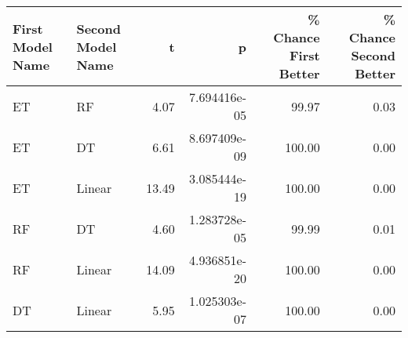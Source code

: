 \begin{tabular}{llrrrr}
\toprule
First Model Name & Second Model Name &     t &            p &  \% Chance First Better &  \% Chance Second Better \\
\midrule
              ET &                RF &  4.07 & 7.694416e-05 &                  99.97 &                    0.03 \\
              ET &                DT &  6.61 & 8.697409e-09 &                 100.00 &                    0.00 \\
              ET &            Linear & 13.49 & 3.085444e-19 &                 100.00 &                    0.00 \\
              RF &                DT &  4.60 & 1.283728e-05 &                  99.99 &                    0.01 \\
              RF &            Linear & 14.09 & 4.936851e-20 &                 100.00 &                    0.00 \\
              DT &            Linear &  5.95 & 1.025303e-07 &                 100.00 &                    0.00 \\
\bottomrule
\end{tabular}
